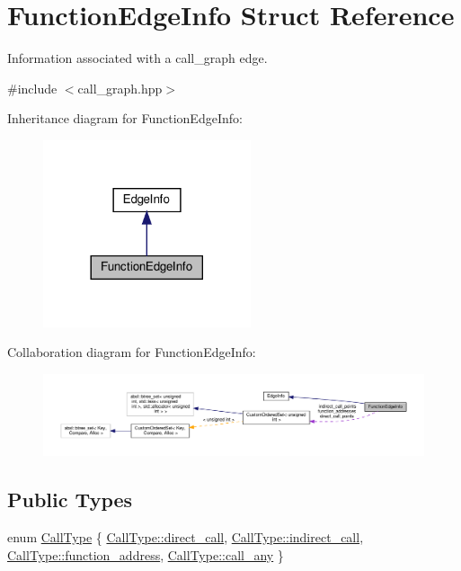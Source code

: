 \hypertarget{structFunctionEdgeInfo}{}\section{Function\+Edge\+Info Struct Reference}
\label{structFunctionEdgeInfo}


Information associated with a call\+\_\+graph edge.  




{\ttfamily \#include $<$call\+\_\+graph.\+hpp$>$}



Inheritance diagram for Function\+Edge\+Info\+:
\nopagebreak
\begin{figure}[H]
\begin{center}
\leavevmode
\includegraphics[width=173pt]{d9/d0b/structFunctionEdgeInfo__inherit__graph}
\end{center}
\end{figure}


Collaboration diagram for Function\+Edge\+Info\+:
\nopagebreak
\begin{figure}[H]
\begin{center}
\leavevmode
\includegraphics[width=350pt]{df/d4a/structFunctionEdgeInfo__coll__graph}
\end{center}
\end{figure}
\subsection*{Public Types}
\begin{DoxyCompactItemize}
\item 
enum \hyperlink{structFunctionEdgeInfo_a39413ce8498ca68ed43c3f171f2607ef}{Call\+Type} \{ \hyperlink{structFunctionEdgeInfo_a39413ce8498ca68ed43c3f171f2607efadf0e543a6dde1403dc679f46be2a0ee3}{Call\+Type\+::direct\+\_\+call}, 
\hyperlink{structFunctionEdgeInfo_a39413ce8498ca68ed43c3f171f2607efa60c42870a8726207be24b9a1265a0543}{Call\+Type\+::indirect\+\_\+call}, 
\hyperlink{structFunctionEdgeInfo_a39413ce8498ca68ed43c3f171f2607efa6d09f4b0c3137709ec4dd3238f84de56}{Call\+Type\+::function\+\_\+address}, 
\hyperlink{structFunctionEdgeInfo_a39413ce8498ca68ed43c3f171f2607efab1244fa11904b47a0a434cd5bf0c071f}{Call\+Type\+::call\+\_\+any}
 \}
\end{DoxyCompactItemize}
